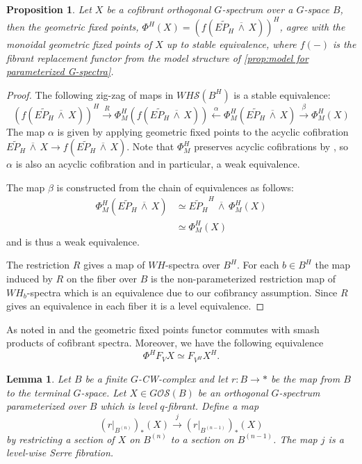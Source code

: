 \documentclass[11pt]{amsart}
\newcommand{\cS}{\mathcal{S}}
\newcommand{\barsmash}{\,\overline\wedge\,}
\newcommand{\Osp}{\mathcal{OS}}
\theoremstyle{plain}   %
\newtheorem{lem}[thm]{Lemma}
\newtheorem{prop}[thm]{Proposition}
\theoremstyle{definition}
\theoremstyle{remark}
\numberwithin{equation}{section}
\begin{document}
\begin{prop}\label{prop:geometric fixed points}
Let $X$ be a cofibrant orthogonal $G$-spectrum over a $G$-space $B$, then the geometric fixed points, $\Phi^H(X)=(f(\widetilde{EP_H}\barsmash X))^H$, agree with the monoidal geometric fixed points of $X$ up to stable equivalence, where $f(-)$ is the fibrant replacement functor from the model structure of \cref{prop:model for parameterized G-spectra}. 
\end{prop}

\begin{proof}
The following zig-zag of maps in $WH\cS(B^H)$ is a stable equivalence:
\[
(f(\widetilde{EP_H}\barsmash X))^H\xrightarrow{R}\Phi_M^H(f(\widetilde{EP_H}\barsmash X)) \xleftarrow{\alpha} \Phi_M^H(\widetilde{EP_H}\barsmash X)\xrightarrow{\beta}\Phi_M^H(X)
\]
The map $\alpha$ is given by applying geometric fixed points to the acyclic cofibration $\widetilde{EP_H}\barsmash X\to f(\widetilde{EP_H}\barsmash X)$. Note that $\Phi_M^H$ preserves acyclic cofibrations by \cite{mp2}, so $\alpha$ is also an acyclic cofibration and in particular, a weak equivalence. 

The map $\beta$ is constructed from the chain of equivalences as follows:
\begin{align*}
\Phi_M^H(\widetilde{EP_H}\barsmash X)
& \simeq \widetilde{EP_H}^H\barsmash \Phi_M^H(X)\\
& \simeq \Phi_M^H(X)
\end{align*}
and is thus a weak equivalence.

The restriction $R$ gives a map of $WH$-spectra over $B^H$. For each $b\in B^H$ the map induced by $R$ on the fiber over $B$ is the non-parameterized restriction map of $WH_b$-spectra which is an equivalence due to our cofibrancy assumption. Since $R$ gives an equivalence in each fiber it is a level equivalence. 
\end{proof}

As noted in \cite{mp2} and \cite{mandell2002equivariant} the geometric fixed points functor commutes with smash products of cofibrant spectra. Moreover, we have the following equivalence
\[
\Phi^H F_VX \simeq F_{V^H}X^H.
\]


\begin{lem}\label{lem:serre fibration}
Let $B$ be a finite $G$-CW-complex and let $r:B\to *$ be the map from $B$ to the terminal $G$-space. Let $X\in G\Osp(B)$ be an orthogonal $G$-spectrum parameterized over $B$ which is level $q$-fibrant. Define a map 
\[
(r|_{B^{(n)}})_*(X) \xrightarrow{j} (r|_{B^{(n-1)}})_*(X)
\]
by restricting a section of $X$ on $B^{(n)}$ to a section on $B^{(n-1)}$. The map $j$ is a level-wise Serre fibration. 
\end{lem}
\end{document}
